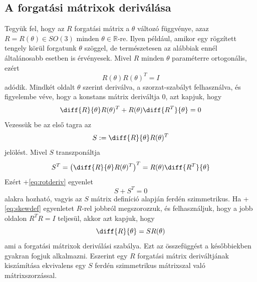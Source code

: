 \documentclass[12pt,a4paper]{report}
\theoremstyle{remark}
\theoremstyle{definition}
\begin{document}
\subsection{A forgatási mátrixok deriválása}
Tegyük fel, hogy az $R$ forgatási mátrix a $\theta$ változó függvénye, azaz $R = R(\theta) \in SO(3)$ minden 
$\theta \in \mathbb{R}$-re. Ilyen például, amikor egy rögzített tengely körül forgatunk $\theta$ szöggel, de 
természetesen az alábbiak ennél általánosabb esetben is érvényesek. Mivel $R$ minden $\theta$ paraméterre 
ortogonális, ezért
\begin{equation}
R(\theta)R(\theta)^T = I
\end{equation}
adódik. Mindkét oldalt $\theta$ szerint deriválva, a szorzat-szabályt felhasználva, és figyelembe véve, hogy a 
konstans mátrix deriváltja $0$, azt kapjuk, hogy
\begin{equation} \label{eq:rotderiv}
\diff{R}{\theta}R(\theta)^T + R(\theta)\diff{R^T}{\theta} = 0
\end{equation}
Vezessük be az első tagra az
\begin{equation} \label{eq:skewdef}
S := \diff{R}{\theta}R(\theta)^T
\end{equation}
jelölést. Mivel $S$ transzponáltja
\begin{equation}
S^T = \left(\diff{R}{\theta}R(\theta)^T\right)^T = R(\theta)\diff{R^T}{\theta}
\end{equation}
Ezért \az+\eqref{eq:rotderiv} egyenlet
\begin{equation}
S + S^T = 0
\end{equation}
alakra hozható, vagyis az $S$ mátrix definíció alapján ferdén szimmetrikus. Ha \az+\eqref{eq:skewdef} egyenletet 
$R$-rel jobbról megszorozzuk, és felhasználjuk, hogy a jobb oldalon $R^TR = I$ teljesül, akkor azt kapjuk, hogy
\begin{equation} \label{eq:rotskewderiv}
\diff{R}{\theta} = SR(\theta)
\end{equation}
ami a forgatási mátrixok deriválási szabálya. Ezt az összefüggést a későbbiekben gyakran fogjuk alkalmazni. Eszerint 
egy $R$ forgatási mátrix deriváltjának kiszámítása ekvivalens egy $S$ ferdén szimmetrikus mátrixszal való 
mátrixszorzással.
\end{document}
